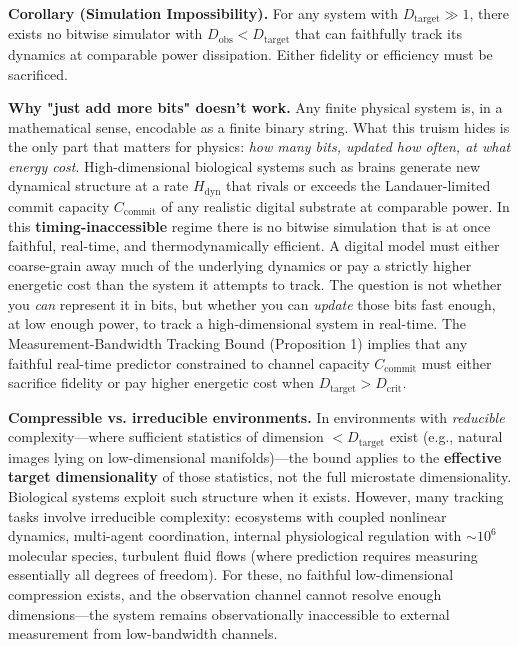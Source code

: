 \documentclass[12pt]{article}
\begin{document}
\textbf{Corollary (Simulation Impossibility).} For any system with $D_{\text{target}} \gg 1$, there exists no bitwise simulator with $D_{\text{obs}} < D_{\text{target}}$ that can faithfully track its dynamics at comparable power dissipation. Either fidelity or efficiency must be sacrificed.

\textbf{Why "just add more bits" doesn't work.} Any finite physical system is, in a mathematical sense, encodable as a finite binary string. What this truism hides is the only part that matters for physics: \textit{how many bits, updated how often, at what energy cost}. High-dimensional biological systems such as brains generate new dynamical structure at a rate $H_{\text{dyn}}$ that rivals or exceeds the Landauer-limited commit capacity $C_{\text{commit}}$ of any realistic digital substrate at comparable power. In this \textbf{timing-inaccessible} regime there is no bitwise simulation that is at once faithful, real-time, and thermodynamically efficient. A digital model must either coarse-grain away much of the underlying dynamics or pay a strictly higher energetic cost than the system it attempts to track. The question is not whether you \textit{can} represent it in bits, but whether you can \textit{update} those bits fast enough, at low enough power, to track a high-dimensional system in real-time. The Measurement-Bandwidth Tracking Bound (Proposition 1) implies that any faithful real-time predictor constrained to channel capacity $C_{\text{commit}}$ must either sacrifice fidelity or pay higher energetic cost when $D_{\text{target}} > D_{\text{crit}}$.

\textbf{Compressible vs. irreducible environments.} In environments with \textit{reducible} complexity—where sufficient statistics of dimension $< D_{\text{target}}$ exist (e.g., natural images lying on low-dimensional manifolds)—the bound applies to the \textbf{effective target dimensionality} of those statistics, not the full microstate dimensionality. Biological systems exploit such structure when it exists. However, many tracking tasks involve irreducible complexity: ecosystems with coupled nonlinear dynamics, multi-agent coordination, internal physiological regulation with $\sim 10^6$ molecular species, turbulent fluid flows (where prediction requires measuring essentially all degrees of freedom). For these, no faithful low-dimensional compression exists, and the observation channel cannot resolve enough dimensions—the system remains observationally inaccessible to external measurement from low-bandwidth channels.
\end{document}
